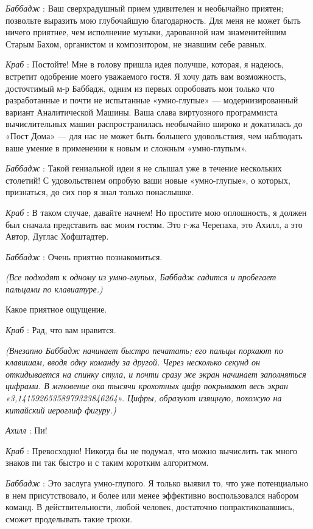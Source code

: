 \documentclass[../main.tex]{subfiles}
\begin{document}
\begin{dialogue}
\emph{Баббадж} : Ваш сверхрадушный прием удивителен и необычайно приятен; позвольте выразить мою глубочайшую благодарность. Для меня не может быть ничего приятнее, чем исполнение музыки, дарованной нам знаменитейшим Старым Бахом, органистом и композитором, не знавшим себе равных.

\emph{Краб} : Постойте! Мне в голову пришла идея получше, которая, я надеюсь, встретит одобрение моего уважаемого гостя. Я хочу дать вам возможность, досточтимый м-р Баббадж, одним из первых опробовать мои только что разработанные и почти не испытанные «умно-глупые» --- модернизированный вариант Аналитической Машины. Ваша слава виртуозного программиста вычислительных машин распространилась необычайно широко и докатилась до «Пост Дома» --- для нас не может быть большего удовольствия, чем наблюдать ваше умение в применении к новым и сложным «умно-глупым».

\emph{Баббадж} : Такой гениальной идеи я не слышал уже в течение нескольких столетий! С удовольствием опробую ваши новые «умно-глупые», о которых, признаться, до сих пор я знал только понаслышке.

\emph{Краб} : В таком случае, давайте начнем! Но простите мою оплошность, я должен был сначала представить вас моим гостям. Это г-жа Черепаха, это Ахилл, а это Автор, Дуглас Хофштадтер.

\emph{Баббадж} : Очень приятно познакомиться.

\emph{(Все подходят к одному из умно-глупых, Баббадж садится и пробегает пальцами по клавиатуре.)}

Какое приятное ощущение.

\emph{Краб} : Рад, что вам нравится.

\emph{(Внезапно Баббадж начинает быстро печатать; его пальцы порхают по клавишам, вводя одну команду за другой. Через несколько секунд он откидывается на спинку стула, и почти сразу же экран начинает заполняться цифрами. В мгновение ока тысячи крохотных цифр покрывают весь экран «3,14159265358979323846264». Цифры, образуют изящную, похожую на китайский иероглиф фигуру.)}

\emph{Ахилл} : Пи!

\emph{Краб} : Превосходно! Никогда бы не подумал, что можно вычислить так много знаков пи так быстро и с таким коротким алгоритмом.

\emph{Баббадж} : Это заслуга умно-глупого. Я только выявил то, что уже потенциально в нем присутствовало, и более или менее эффективно воспользовался набором команд. В действительности, любой человек, достаточно попрактиковавшись, сможет проделывать такие трюки.


\end{dialogue}
\end{document}
